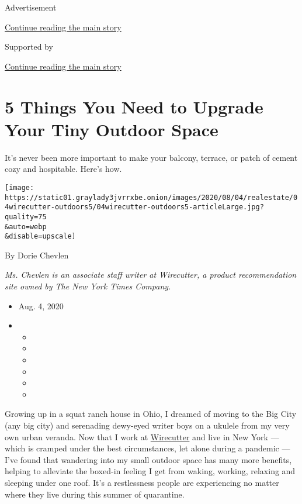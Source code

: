 Advertisement

\protect\hyperlink{after-top}{Continue reading the main story}

Supported by

\protect\hyperlink{after-sponsor}{Continue reading the main story}

\hypertarget{5-things-you-need-to-upgrade-your-tiny-outdoor-space}{%
\section{5 Things You Need to Upgrade Your Tiny Outdoor
Space}\label{5-things-you-need-to-upgrade-your-tiny-outdoor-space}}

It's never been more important to make your balcony, terrace, or patch
of cement cozy and hospitable. Here's how.

\texttt{[image: https://static01.graylady3jvrrxbe.onion/images/2020/08/04/realestate/04wirecutter-outdoors5/04wirecutter-outdoors5-articleLarge.jpg?quality=75\\\&auto=webp\\\&disable=upscale]}

By Dorie Chevlen

\emph{Ms. Chevlen is an associate staff writer at Wirecutter, a product
recommendation site owned by The New York Times Company.}

\begin{itemize}
\item
  Aug. 4, 2020
\item
  \begin{itemize}
  \item
  \item
  \item
  \item
  \item
  \item
  \end{itemize}
\end{itemize}

Growing up in a squat ranch house in Ohio, I dreamed of moving to the
Big City (any big city) and serenading dewy-eyed writer boys on a
ukulele from my very own urban veranda. Now that I work at
\href{http://www.nytimes3xbfgragh.onion/wirecutter?utm_source=nytimes\&utm_medium=referral\&utm_campaign=outdoor-space}{Wirecutter}
and live in New York --- which is cramped under the best circumstances,
let alone during a pandemic --- I've found that wandering into my small
outdoor space has many more benefits, helping to alleviate the boxed-in
feeling I get from waking, working, relaxing and sleeping under one
roof. It's a restlessness people are experiencing no matter where they
live during this summer of quarantine.

